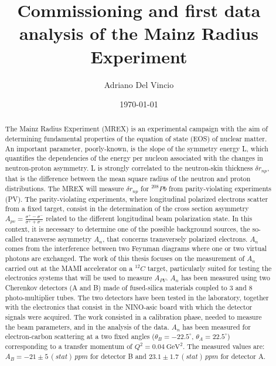 \documentclass[11pt]{article}
\author{Adriano Del Vincio}
\date{\today}
\title{Commissioning and first data analysis of the Mainz Radius Experiment}
\begin{document}
\maketitle
\begin{abstract}
The Mainz Radius Experiment (MREX) is an experimental campaign with the aim of determining fundamental properties of the equation of state (EOS) of nuclear matter. An important parameter, poorly-known, is the slope of the symmetry energy L, which quantifies the dependencies of the energy per nucleon associated with the changes in neutron-proton asymmetry. L is strongly correlated to the neutron-skin thickness $\delta r_{np}$, that is the difference between the mean square radius of the neutron and proton distributions. The MREX will measure $\delta r_{np}$ for $^{208}Pb$ from parity-violating experiments (PV). The parity-violating experiments, where longitudinal polarized electrons scatter from a fixed target, consist in the determination of the cross section asymmetry $A_{pv} = \frac{\sigma^{+} - \sigma^{-}}{\sigma^{+} + \sigma^{-}}$ related to the different longitudinal beam polarization state. In this context, it is necessary to determine one of the possible background sources, the so-called transverse asymmetry $A_{n}$, that concerns transversely polarized electrons. $A_{n}$ comes from the interference between two Feynman diagrams where one or two virtual photons are exchanged. The work of this thesis focuses on the measurement of $A_{n}$ carried out at the MAMI accelerator on a $^{12}C$ target, particularly suited for testing the electronics systems that will be used to measure $A_{PV}$. $A_{n}$ has been measured using two Cherenkov detectors (A and B) made of fused-silica materials coupled to 3 and 8 photo-multiplier tubes. The two detectors have been tested in the laboratory, together with the electronics that consist in the NINO-asic board with which the detector signals were acquired. The work consisted in a calibration phase, needed to measure the beam parameters, and in the analysis of the data. $A_{n}$ has been measured for electron-carbon scattering at a two fixed angles ($\theta_{B} = -22.5 ^{\circ}$, $\theta_{A} = 22.5 ^{\circ}$) corresponding to a transfer momentum of $Q^{2} = \SI{0.04}{\giga \electronvolt \squared}$. The measured values are: $A_{B} = -21 \pm 5 \, (stat) \, ppm$ for detector B and $23.1 \pm 1.7 \,(stat) \, ppm$  for detector A.
\end{abstract}
\end{document}
